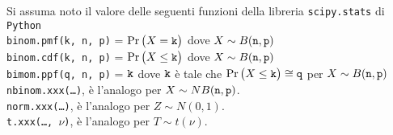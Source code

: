 \documentclass[11pt,twoside,a4paper]{article}
\begin{document}
Si assuma noto il valore delle seguenti funzioni della libreria {\tt scipy.stats\/} di  {\tt Python\/}\\
{\tt binom.pmf(k, n, p)} = $\Pr\big(X={\tt k}\big)$ dove $X\sim B({\tt n},{\tt p})$\\
{\tt binom.cdf(k, n, p)} = $\Pr\big(X\le{\tt k}\big)$ dove  $X\sim B({\tt n},{\tt p})$ \\
{\tt bimom.ppf(q, n, p)} = ${\tt k}$ dove ${\tt k}$ è tale che 
                           $\Pr\big(X\le{\tt k}\big)\cong{\tt q}$ per $X\sim B({\tt n},{\tt p})$\\
{\tt nbinom.xxx(\ldots)}, è l'analogo per $X\sim NB({\tt n},{\tt p})$.\\
{\tt norm.xxx(\ldots)}, è l'analogo per $Z\sim N(0,1)$.\\
\hfill{\tt t.xxx(\ldots, $\nu$)}, è l'analogo per $T\sim t(\nu)$.
\end{document}
